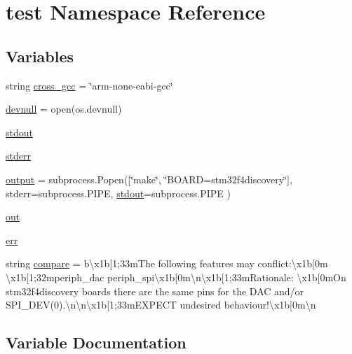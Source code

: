 \hypertarget{namespacetest}{}\section{test Namespace Reference}
\label{namespacetest}
\subsection*{Variables}
\begin{DoxyCompactItemize}
\item 
string \hyperlink{namespacetest_a6f76a6282511bb6b2d8e2953ba655cff}{cross\+\_\+gcc} = \char`\"{}arm-\/none-\/eabi-\/gcc\char`\"{}
\item 
\hyperlink{namespacetest_a899783dcbb70824df8ffcb5f91af0aa3}{devnull} = open(os.\+devnull)
\item 
\hyperlink{namespacetest_a6a4f0f87a5461eec246e70e9213db991}{stdout}
\item 
\hyperlink{namespacetest_ab481765e85c55d40700cce953bc42f17}{stderr}
\item 
\hyperlink{namespacetest_a07b64f21658cf1faa97a31563ac979d2}{output} = subprocess.\+Popen(\mbox{[}\char`\"{}make\char`\"{}, \char`\"{}B\+O\+A\+RD=stm32f4discovery\char`\"{}\mbox{]}, stderr=subprocess.\+P\+I\+PE, \hyperlink{namespacetest_a6a4f0f87a5461eec246e70e9213db991}{stdout}=subprocess.\+P\+I\+PE )
\item 
\hyperlink{namespacetest_af72209c5b4371115dcf115f20e7f119c}{out}
\item 
\hyperlink{namespacetest_a135aab9be201f9d1b818716d7cd2476d}{err}
\item 
string \hyperlink{namespacetest_ac02e86204b41865fdc6c46f88d277aa1}{compare} = b\textquotesingle{}\textbackslash{}x1b\mbox{[}1;33m\+The following features may conflict\+:\textbackslash{}x1b\mbox{[}0m \textbackslash{}x1b\mbox{[}1;32mperiph\+\_\+dac periph\+\_\+spi\textbackslash{}x1b\mbox{[}0m\textbackslash{}n\textbackslash{}x1b\mbox{[}1;33m\+Rationale\+: \textbackslash{}x1b\mbox{[}0m\+On stm32f4discovery boards there are the same pins for the D\+A\+C and/or S\+P\+I\+\_\+\+D\+E\+V(0).\textbackslash{}n\textbackslash{}n\textbackslash{}x1b\mbox{[}1;33m\+E\+X\+P\+E\+C\+T undesired behaviour!\textbackslash{}x1b\mbox{[}0m\textbackslash{}n\textquotesingle{}
\end{DoxyCompactItemize}


\subsection{Variable Documentation}
\mbox{\label{namespacetest_ac02e86204b41865fdc6c46f88d277aa1}} 
